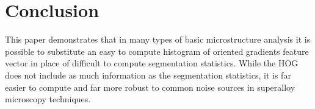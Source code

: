 \documentclass[review]{elsarticle}
\begin{document}
	\section{Conclusion}
	
	This paper demonstrates that in many types of basic microstructure analysis it is possible to substitute an easy to compute histogram of oriented gradients feature vector in place of difficult to compute segmentation statistics. While the HOG does not include as much information as the segmentation statistics, it is far easier to compute and far more robust to common noise sources in superalloy microscopy techniques.
	

\end{document}
